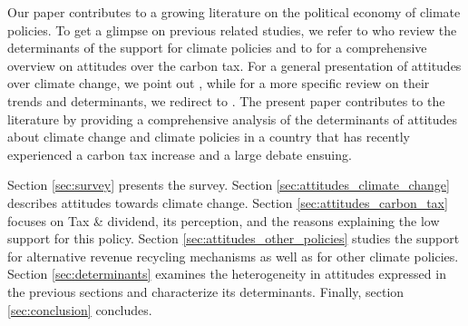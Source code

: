 \documentclass[english,5p,authoryear]{elsarticle}
\begin{document}
Our paper contributes to a growing literature on the political economy of climate policies. To get a glimpse on previous related studies, we refer to \citet{drews_van_der_bergh_2016} who review the determinants of the support for climate policies and to \citet{carattini_overcoming_2018} for a comprehensive overview on attitudes over the carbon tax. For a general presentation of attitudes over climate change, we point out \citet{whitmarsh_2_2018}, while for a more specific review on their trends and determinants, we redirect to \citet{brechin_public_2010}. The present paper contributes to the literature by providing a comprehensive analysis of the determinants of attitudes about climate change and climate policies in a country that has recently experienced a carbon tax increase and a large debate ensuing.




Section \ref{sec:survey} presents the survey. Section \ref{sec:attitudes_climate_change} describes attitudes towards climate change. Section \ref{sec:attitudes_carbon_tax} focuses on Tax \& dividend, its perception, and the reasons explaining the low support for this policy. Section \ref{sec:attitudes_other_policies} studies the support for alternative revenue recycling mechanisms as well as for other climate policies. Section \ref{sec:determinants} examines the heterogeneity in attitudes expressed in the previous sections and characterize its determinants. Finally, section \ref{sec:conclusion} concludes.
\end{document}
